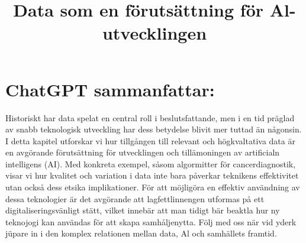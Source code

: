 {{{{\title{
Data som en förutsättning för Al-utvecklingen
}
\section*{ChatGPT sammanfattar:}
Historiskt har data spelat en central roll i beslutsfattande, men i en tid präglad av snabb teknologisk utveckling har dess betydelse blivit mer tuttad än någonsin.
I detta kapitel utforskar vi hur tillgången till relevant och högkvaltativa data är en avgörande förutsättning för utvecklingen och tillämoningen av artificialn intelligens (AI). Med konkreta exempel, såsom algormitter för cancerdiagnostik, visar vi hur kvalitet och variation i data inte bara påverkar teknikens effektivitet utan också dess etsika implikationer. För att möjligöra en effektiv användning av dessa teknologier är det avgörande att lagfettlinnengen utformas på ett digitaliseringsvänligt stätt, vilket innebär att man tidigt bär beaktla hur ny teknojogi kan användas för att skapa samhåljenytta. Följ med oss när vid yderk jüpare in i den komplex relationen mellan data, Al och samhällets framtid.
}}}}
